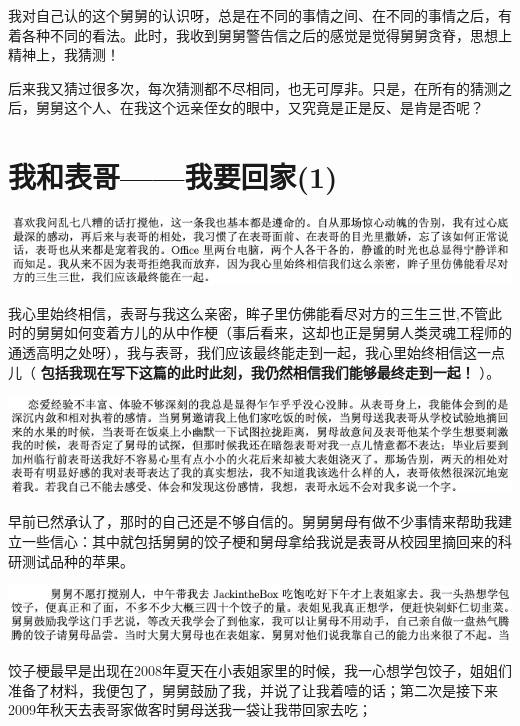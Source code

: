 \documentclass[9pt, b5paper]{article}
\begin{document}
我对自己认的这个舅舅的认识呀，总是在不同的事情之间、在不同的事情之后，有着各种不同的看法。此时，我收到舅舅警告信之后的感觉是觉得舅舅贪脊，思想上精神上，我猜测！

后来我又猜过很多次，每次猜测都不尽相同，也无可厚非。只是，在所有的猜测之后，舅舅这个人、在我这个远亲侄女的眼中，又究竟是正是反、是肯是否呢？

\section{我和表哥——我要回家(1)}
\label{sec:orgf14eea5}

\begin{center}
\includegraphics[width=.9\linewidth]{./pic/p1p118.png}
\end{center}

我心里始终相信，表哥与我这么亲密，眸子里仿佛能看尽对方的三生三世,不管此时的舅舅如何变着方儿的从中作梗（事后看来，这却也正是舅舅人类灵魂工程师的通透高明之处呀），我与表哥，我们应该最终能走到一起，我心里始终相信这一点儿（ \textbf{包括我现在写下这篇的此时此刻，我仍然相信我们能够最终走到一起！} ）。

\begin{center}
\includegraphics[width=.9\linewidth]{./pic/p1p118-2.png}
\end{center}

早前已然承认了，那时的自己还是不够自信的。舅舅舅母有做不少事情来帮助我建立一些信心：其中就包括舅舅的饺子梗和舅母拿给我说是表哥从校园里摘回来的科研测试品种的苹果。

\begin{center}
\includegraphics[width=.9\linewidth]{./pic/p1p34-2.png}
\end{center}

饺子梗最早是出现在2008年夏天在小表姐家里的时候，我一心想学包饺子，姐姐们准备了材料，我便包了，舅舅鼓励了我，并说了让我着噎的话；第二次是接下来2009年秋天去表哥家做客时舅母送我一袋让我带回家去吃；
\end{document}
